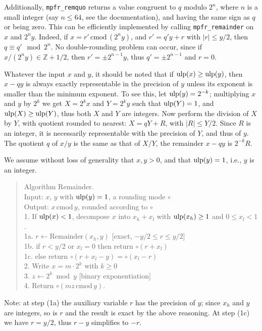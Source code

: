 \documentclass[12pt]{amsart}
\def\ulp{{\rm ulp}}
\def\cmod{\,\mathrm{cmod}\,}
\begin{document}
Additionally, \texttt{mpfr\_remquo} returns a value congruent to $q$
modulo $2^n$, where $n$ is a small integer (say $n \leq 64$, see the
documentation), and having the same sign as $q$ or being zero.
This can be efficiently implemented by calling \texttt{mpfr\_remainder} on
$x$ and $2^n y$. Indeed, if $x = r' \cmod (2^n y)$, and
$r' = q' y + r$ with $|r| \leq y/2$, then
$q \equiv q' \mod 2^n$. No double-rounding problem can occur, since if
$x/(2^n y) \in {\mathbb Z} + 1/2$,
then $r'=\pm 2^{n-1} y$, thus $q'=\pm 2^{n-1}$ and $r=0$.

Whatever the input $x$ and $y$, it should be noted that if $\ulp(x) \geq
\ulp(y)$, then $x - q y$ is always
exactly representable in the precision of $y$ unless its exponent is smaller
than the minimum exponent. To see this,
let $\ulp(y) = 2^{-k}$;
multiplying $x$ and $y$ by $2^k$ we get $X = 2^k x$ and
$Y = 2^k y$ such that $\ulp(Y)=1$,
and $\ulp(X) \geq \ulp(Y)$, thus both $X$ and $Y$ are integers.
Now perform the division of $X$ by $Y$, with quotient rounded to nearest:
$X = q Y + R$, with $|R| \leq Y/2$. Since $R$ is an integer, it is
necessarily representable with the precision of $Y$, and thus of $y$.
The quotient $q$ of $x/y$ is the same as that of $X/Y$, the remainder
$x - q y$ is $2^{-k} R$.

We assume without loss of generality that $x, y > 0$, and that
$\ulp(y) = 1$, i.e., $y$ is an integer.
\begin{quote}
Algorithm Remainder. \\
Input: $x$, $y$ with $\ulp(y)=1$, a rounding mode $\circ$ \\
Output: $x \cmod y$, rounded according to $\circ$ \\
1. If $\ulp(x) < 1$, decompose $x$ into $x_h + x_l$ with $\ulp(x_h) \geq 1$
   and $0 \leq x_l < 1$. \\
1a. $r \leftarrow \mathrm{Remainder}(x_h, y)$ [exact, $-y/2 \leq r \leq y/2$]\\
1b. if $r < y/2$ or $x_l = 0$ then return $\circ(r + x_l)$ \\
1c. else return $\circ(r + x_l - y) = \circ(x_l - r)$ \\
2. Write $x = m \cdot 2^k$ with $k \geq 0$ \\
3. $z \leftarrow 2^k \bmod y$ [binary exponentiation] \\
4. Return $\circ(mz \cmod y)$.
\end{quote}
Note: at step (1a) the auxiliary variable $r$ has the precision of $y$;
since $x_h$ and $y$ are integers, so is $r$ and the result is exact by the
above reasoning. At step (1c) we have $r=y/2$, thus $r-y$ simplifies to $-r$.
\end{document}
